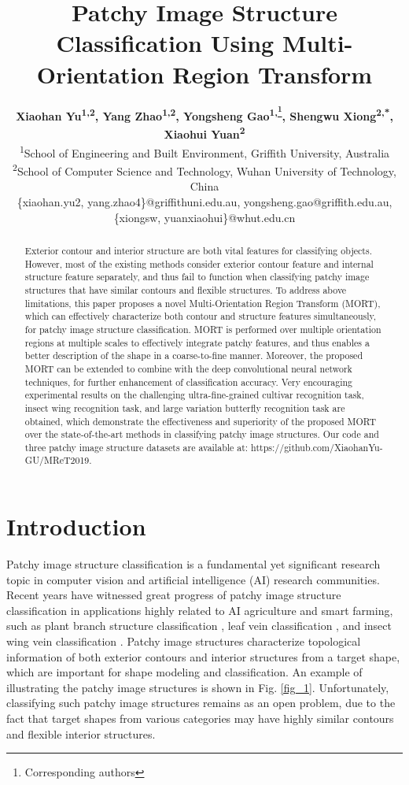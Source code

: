 \documentclass[letterpaper]{article} %
\title{Patchy Image Structure Classification Using Multi-Orientation Region Transform}
\author{\Large \textbf{Xiaohan Yu\textsuperscript{\rm 1,2}, Yang Zhao\textsuperscript{\rm 1,2}, Yongsheng Gao\textsuperscript{\rm 1,\thanks{Corresponding authors}}, Shengwu Xiong\textsuperscript{\rm 2,*}, Xiaohui Yuan\textsuperscript{\rm 2}}\\ 
\textsuperscript{\rm 1}School of Engineering and Built Environment, Griffith University, Australia\\ %
\textsuperscript{\rm 2}School of Computer Science and Technology, Wuhan University of Technology, China\\
\{xiaohan.yu2, yang.zhao4\}@griffithuni.edu.au, yongsheng.gao@griffith.edu.au, 
\{xiongsw, yuanxiaohui\}@whut.edu.cn %
}
\begin{document}
\maketitle

\begin{abstract}
   Exterior contour and interior structure are both vital features for classifying objects. However, most of the existing methods consider exterior contour feature and internal structure feature separately, and thus fail to function when classifying patchy image structures that have similar contours and flexible structures. To address above limitations, this paper proposes a novel Multi-Orientation Region Transform (MORT), which can effectively characterize both contour and structure features simultaneously, for patchy image structure classification. MORT is performed over multiple orientation regions at multiple scales to effectively integrate patchy features, and thus enables a better description of the shape in a coarse-to-fine manner. Moreover, the proposed MORT can be extended to combine with the deep convolutional neural network techniques, for further enhancement of classification accuracy. Very encouraging experimental results on the challenging ultra-fine-grained cultivar recognition task, insect wing recognition task, and large variation butterfly recognition task are obtained, which demonstrate the effectiveness and superiority of the proposed MORT over the state-of-the-art methods in classifying patchy image structures. Our code and three patchy image structure datasets are available at: https://github.com/XiaohanYu-GU/MReT2019.   
\end{abstract}


\section{Introduction}

Patchy image structure classification is a fundamental yet significant research topic in computer vision and artificial intelligence (AI) research communities. Recent years have witnessed great progress of patchy image structure classification in applications highly related to AI agriculture and smart farming, such as plant branch structure classification \cite{8}, leaf vein classification \cite{9}, and insect wing vein classification \cite{41}. Patchy image structures characterize topological information of both exterior contours and interior structures from a target shape, which are important for shape modeling and classification. An example of illustrating the patchy image structures is shown in Fig. \ref{fig_1}.  Unfortunately, classifying such patchy image structures remains as an open problem, due to the fact that target shapes from various categories may have highly similar contours and flexible interior structures. 
\end{document}

